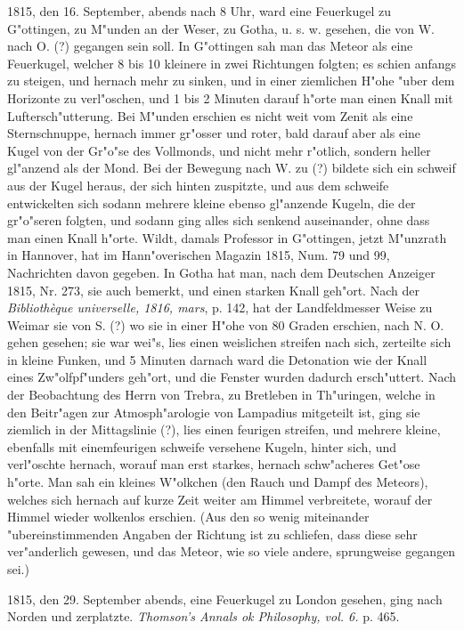 \documentclass[a4paper, 11pt, oneside, polutonikogreek, german]{article}
\begin{document}
1815, den 16. September, abends nach 8 Uhr, ward eine Feuerkugel zu G"ottingen, zu M"unden an der Weser, zu Gotha, u. s. w. gesehen, die von W. nach O. (?) gegangen sein soll. In G"ottingen sah man das Meteor als eine Feuerkugel, welcher 8 bis 10 kleinere in zwei Richtungen folgten; es schien anfangs zu steigen, und hernach mehr zu sinken, und in einer ziemlichen H"ohe "uber dem Horizonte zu verl"oschen, und 1 bis 2 Minuten darauf h"orte man einen Knall mit Luftersch"utterung. Bei M"unden erschien es nicht weit vom Zenit als eine Sternschnuppe, hernach immer gr"osser und roter, bald darauf aber als eine Kugel von der Gr"o"se des Vollmonds, und nicht mehr r"otlich, sondern heller gl"anzend als der Mond. Bei der Bewegung nach W. zu (?) bildete sich ein schweif aus der Kugel heraus, der sich hinten zuspitzte, und aus dem schweife entwickelten sich sodann mehrere kleine ebenso gl"anzende Kugeln, die der gr"o"seren folgten, und sodann ging alles sich senkend auseinander, ohne dass man einen Knall h"orte. Wildt, damals Professor in G"ottingen, jetzt M"unzrath in Hannover, hat im Hann"overischen Magazin 1815, Num. 79 und 99, Nachrichten davon gegeben. In Gotha hat man, nach dem Deutschen Anzeiger 1815, Nr. 273, sie auch bemerkt, und einen starken Knall geh"ort. Nach der \emph{Bibliothèque universelle, 1816, mars}, p. 142, hat der Landfeldmesser Weise zu Weimar sie von S. (?) wo sie in einer H"ohe von 80 Graden erschien, nach N. O. gehen gesehen; sie war wei"s, lies einen weislichen streifen nach sich, zerteilte sich in kleine Funken, und 5 Minuten darnach ward die Detonation wie der Knall eines Zw"olfpf"unders geh"ort, und die Fenster wurden dadurch ersch"uttert. Nach der Beobachtung des Herrn von Trebra, zu Bretleben in Th"uringen, welche in den Beitr"agen zur Atmosph"arologie von Lampadius mitgeteilt ist, ging sie ziemlich in der Mittagslinie (?), lies einen feurigen streifen, und mehrere kleine, ebenfalls mit einemfeurigen schweife versehene Kugeln, hinter sich, und verl"oschte hernach, worauf man erst starkes, hernach schw"acheres Get"ose h"orte. Man sah ein kleines W"olkchen (den Rauch und Dampf des Meteors), welches sich hernach auf kurze Zeit weiter am Himmel verbreitete, worauf der Himmel wieder wolkenlos erschien. (Aus den so wenig miteinander "ubereinstimmenden Angaben der Richtung ist zu schliefen, dass diese sehr ver"anderlich gewesen, und das Meteor, wie so viele andere, sprungweise gegangen sei.)

1815, den 29. September abends, eine Feuerkugel zu London gesehen, ging nach Norden und zerplatzte. \emph{Thomson's Annals ok Philosophy, vol. 6.} p. 465.
\end{document}
